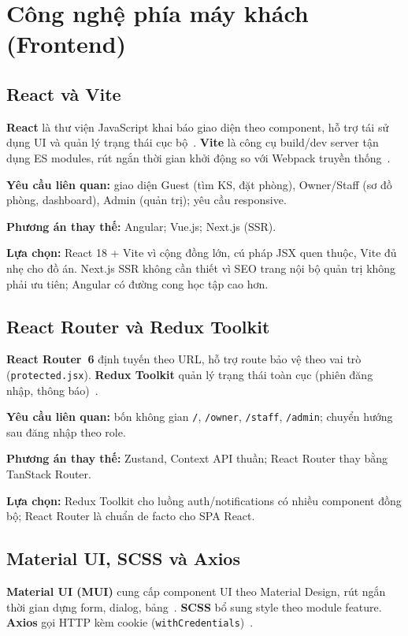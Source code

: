 \documentclass[../DoAn.tex]{subfiles}
\begin{document}
\section{Công nghệ phía máy khách (Frontend)}
\label{section:3.3}

\subsection{React và Vite}

\textbf{React} là thư viện JavaScript khai báo giao diện theo component, hỗ trợ tái sử dụng UI và quản lý trạng thái cục bộ~\cite{react2024}. \textbf{Vite} là công cụ build/dev server tận dụng ES modules, rút ngắn thời gian khởi động so với Webpack truyền thống~\cite{vite2024}.

\textbf{Yêu cầu liên quan:} giao diện Guest (tìm KS, đặt phòng), Owner/Staff (sơ đồ phòng, dashboard), Admin (quản trị); yêu cầu responsive.

\textbf{Phương án thay thế:} Angular; Vue.js; Next.js (SSR).

\textbf{Lựa chọn:} React 18 + Vite vì cộng đồng lớn, cú pháp JSX quen thuộc, Vite đủ nhẹ cho đồ án. Next.js SSR không cần thiết vì SEO trang nội bộ quản trị không phải ưu tiên; Angular có đường cong học tập cao hơn.

\subsection{React Router và Redux Toolkit}

\textbf{React Router~6} định tuyến theo URL, hỗ trợ route bảo vệ theo vai trò (\texttt{protected.jsx}). \textbf{Redux Toolkit} quản lý trạng thái toàn cục (phiên đăng nhập, thông báo)~\cite{redux2024}.

\textbf{Yêu cầu liên quan:} bốn không gian \texttt{/}, \texttt{/owner}, \texttt{/staff}, \texttt{/admin}; chuyển hướng sau đăng nhập theo role.

\textbf{Phương án thay thế:} Zustand, Context API thuần; React Router thay bằng TanStack Router.

\textbf{Lựa chọn:} Redux Toolkit cho luồng auth/notifications có nhiều component đồng bộ; React Router là chuẩn de facto cho SPA React.

\subsection{Material UI, SCSS và Axios}

\textbf{Material UI (MUI)} cung cấp component UI theo Material Design, rút ngắn thời gian dựng form, dialog, bảng~\cite{mui2024}. \textbf{SCSS} bổ sung style theo module feature. \textbf{Axios} gọi HTTP kèm cookie (\texttt{withCredentials})~\cite{axios2024}.
\end{document}

